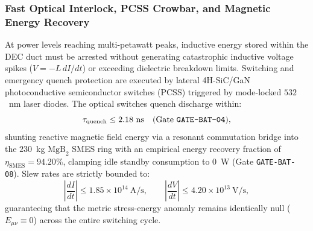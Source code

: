 \documentclass[11pt,onecolumn]{article}
\begin{document}
\FloatBarrier
\subsubsection{Fast Optical Interlock, PCSS Crowbar, and Magnetic Energy Recovery}
\label{subsubsec:pcss_crowbar}
At power levels reaching multi-petawatt peaks, inductive energy stored within the DEC duct must be arrested without generating catastrophic inductive voltage spikes ($V = -L\,dI/dt$) or exceeding dielectric breakdown limits. Switching and emergency quench protection are executed by lateral 4H-SiC/GaN photoconductive semiconductor switches (PCSS) triggered by mode-locked $532$~nm laser diodes. The optical switches quench discharge within:
\begin{equation}
\tau_{\text{quench}} \le 2.18~\text{ns} \quad (\text{Gate \texttt{GATE-BAT-04}}),
\end{equation}
shunting reactive magnetic field energy via a resonant commutation bridge into the $230$~kg $\text{MgB}_2$ SMES ring with an empirical energy recovery fraction of $\eta_{\text{SMES}} = 94.20\%$, clamping idle standby consumption to $0$~W (Gate \texttt{GATE-BAT-08}). Slew rates are strictly bounded to:
\begin{equation}
\left|\frac{dI}{dt}\right| \le 1.85\times 10^{14}~\text{A/s}, \qquad \left|\frac{dV}{dt}\right| \le 4.20\times 10^{13}~\text{V/s},
\end{equation}
guaranteeing that the metric stress-energy anomaly remains identically null ($E_{\mu\nu} \equiv 0$) across the entire switching cycle.

\FloatBarrier
\end{document}
